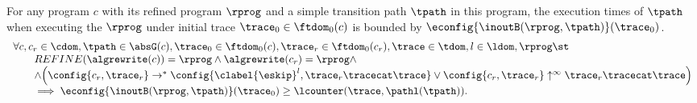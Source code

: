 \begin{lemma}
  \label{lem:pathrb-sound}
  For any program $c$ with its refined program $\rprog$ and a simple transition path $\tpath$ in this program,
  the execution times of $\tpath$ when executing the $\rprog$ under initial trace $\trace_0 \in \ftdom_0(c)$ is bounded by $\econfig{\inoutB(\rprog, \tpath)}(\trace_0)$.
  \[
    \begin{array}{l}
      \forall c, c_r \in \cdom, \tpath \in \absG(c), \trace_0 \in \ftdom_0(c),  \trace_r \in \ftdom_0(c_r), \trace \in \tdom, l \in \ldom, \rprog \st 
      \\ \qquad
      REFINE(\algrewrite(c)) = \rprog
      \land 
      \algrewrite(c_r) = \rprog
      \land
      \\ \qquad
      \land 
      \Big(
        \config{c_r, \trace_r} \rightarrow^* \config{\clabel{\eskip}^{l}, \trace_r \tracecat \trace}
        \lor \config{c_r, \trace_r} \uparrow^{\infty} \trace_r \tracecat \trace 
        \Big)
    \\ \qquad
    \implies
    \econfig{\inoutB(\rprog, \tpath)}(\trace_0) \geq \lcounter(\trace, \pathl(\tpath)).
    \end{array}
  \]
\end{lemma}
%
